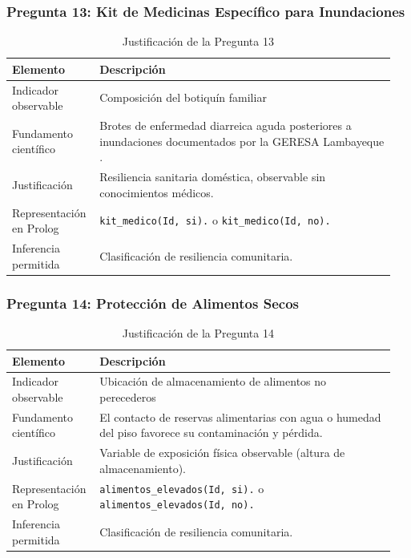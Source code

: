 \documentclass[12pt, letterpaper]{article}
\begin{document}
\subsubsection*{Pregunta 13: Kit de Medicinas Específico para Inundaciones}
\begin{table}[H]
\centering
\caption{Justificación de la Pregunta 13}
\label{tab:p13}
\begin{tabular}{@{}p{0.2\linewidth}p{0.75\linewidth}@{}}
\toprule
\textbf{Elemento} & \textbf{Descripción} \\ \midrule
Indicador observable & Composición del botiquín familiar \\
Fundamento científico & Brotes de enfermedad diarreica aguda posteriores a inundaciones documentados por la GERESA Lambayeque \parencite{geresa_sala}. \\
Justificación & Resiliencia sanitaria doméstica, observable sin conocimientos médicos. \\
Representación en Prolog & \texttt{kit\_medico(Id, si).} o \texttt{kit\_medico(Id, no).} \\
Inferencia permitida & Clasificación de resiliencia comunitaria. \\ \bottomrule
\end{tabular}
\end{table}

\subsubsection*{Pregunta 14: Protección de Alimentos Secos}
\begin{table}[H]
\centering
\caption{Justificación de la Pregunta 14}
\label{tab:p14}
\begin{tabular}{@{}p{0.2\linewidth}p{0.75\linewidth}@{}}
\toprule
\textbf{Elemento} & \textbf{Descripción} \\ \midrule
Indicador observable & Ubicación de almacenamiento de alimentos no perecederos \\
Fundamento científico & El contacto de reservas alimentarias con agua o humedad del piso favorece su contaminación y pérdida. \\
Justificación & Variable de exposición física observable (altura de almacenamiento). \\
Representación en Prolog & \texttt{alimentos\_elevados(Id, si).} o \texttt{alimentos\_elevados(Id, no).} \\
Inferencia permitida & Clasificación de resiliencia comunitaria. \\ \bottomrule
\end{tabular}
\end{table}
\end{document}
